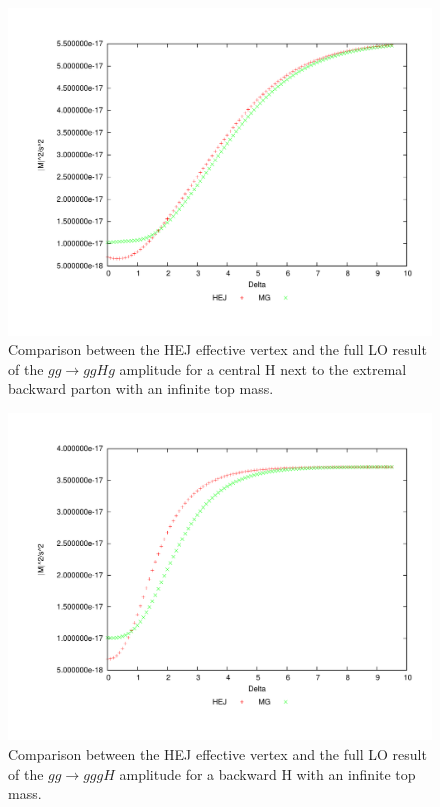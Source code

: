 \begin{figure}[H]
\centering
\includegraphics[scale=0.43]{Images/gg_cen2.pdf}
\caption{Comparison between the HEJ effective vertex and the full LO result of the $gg \to ggHg$ amplitude for a central H next to the extremal backward parton with an infinite top mass.}
\label{fig:gg_ggh_3}
\end{figure}


\begin{figure}[H]
\centering
\includegraphics[scale=0.43]{Images/gg_nextback.pdf}
\caption{Comparison between the HEJ effective vertex and the full LO result of the $gg \to gggH$ amplitude for a backward H with an infinite top mass.}
\label{fig:gg_ggh_4}
\end{figure}

